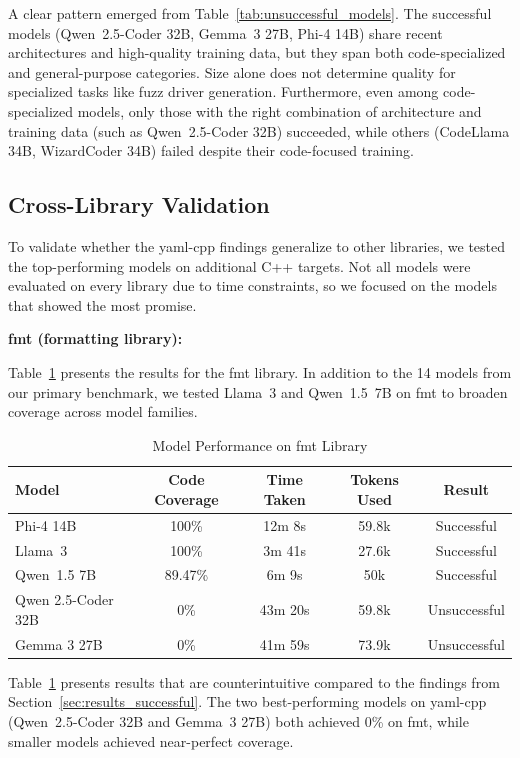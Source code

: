 A clear pattern emerged from Table~\ref{tab:unsuccessful_models}. The successful models (Qwen~2.5-Coder 32B, Gemma~3 27B, Phi-4 14B) share recent architectures and high-quality training data, but they span both code-specialized and general-purpose categories. Size alone does not determine quality for specialized tasks like fuzz driver generation. Furthermore, even among code-specialized models, only those with the right combination of architecture and training data (such as Qwen~2.5-Coder 32B) succeeded, while others (CodeLlama 34B, WizardCoder 34B) failed despite their code-focused training.


\subsection{Cross-Library Validation}
\label{sec:results_cross_library}

To validate whether the yaml-cpp findings generalize to other libraries, we tested the top-performing models on additional C++ targets. Not all models were evaluated on every library due to time constraints, so we focused on the models that showed the most promise.

\textbf{fmt (formatting library):}

Table~\ref{tab:fmt_results} presents the results for the fmt library. In addition to the 14 models from our primary benchmark, we tested Llama~3 and Qwen~1.5~7B on fmt to broaden coverage across model families.

\begin{table}[htbp]
\centering
\caption{Model Performance on fmt Library}
\label{tab:fmt_results}
\small
\begin{tabular}{lcccc}
\toprule
Model & Code Coverage & Time Taken & Tokens Used & Result \\
\midrule
Phi-4 14B & 100\% & 12m 8s & 59.8k & Successful \\
Llama~3 & 100\% & 3m 41s & 27.6k & Successful \\
Qwen~1.5 7B & 89.47\% & 6m 9s & 50k & Successful \\
Qwen 2.5-Coder 32B & 0\% & 43m 20s & 59.8k & Unsuccessful \\
Gemma 3 27B & 0\% & 41m 59s & 73.9k & Unsuccessful \\
\bottomrule
\end{tabular}
\end{table}

Table~\ref{tab:fmt_results} presents results that are counterintuitive compared to the findings from Section~\ref{sec:results_successful}. The two best-performing models on yaml-cpp (Qwen~2.5-Coder 32B and Gemma~3 27B) both achieved 0\% on fmt, while smaller models achieved near-perfect coverage.

